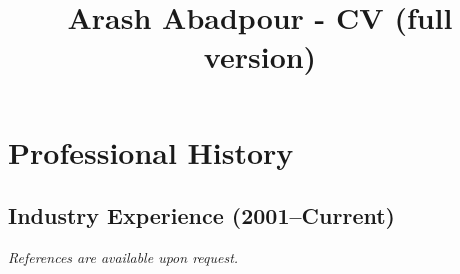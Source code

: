 \documentclass[12pt,a4paper]{moderncv}
\title{Arash Abadpour - CV (full version)}
\begin{document}
\maketitle







\section{Professional History}
\subsection{Industry Experience (2001--Current)}











\emph{References are available upon request.}


\end{document}
